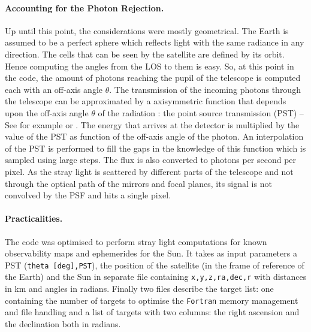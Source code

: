 \documentclass[a4paper,10pt]{article}
\begin{document}
\paragraph{Accounting for the Photon Rejection.} Up until this point, the considerations were mostly geometrical. The Earth is assumed to be a perfect sphere which reflects light with the same radiance in any direction. The cells that can be seen by the satellite are defined by its orbit. Hence computing the angles from the LOS to them is easy.
So, at this point in the code, the amount of photons reaching the pupil of the telescope is computed each with an off-axis angle $\theta$. The transmission of the incoming photons through the telescope can be approximated by a axisymmetric function that depends upon the off-axis angle $\theta$ of the radiation : the point source transmission (PST) -- See for example \cite{Breault2010} or \cite{Pompea1995}. 
The energy that arrives at the detector is multiplied by the value of the PST as function of the off-axis angle of the photon. 
An interpolation of the PST is performed to fill the gaps in the knowledge of this function which is sampled using large steps. The flux is also converted to photons per second per pixel. As the stray light is scattered by different parts of the telescope and not through the optical path of the mirrors and focal planes, its signal is not convolved by the PSF and hits a single pixel.

\paragraph{Practicalities.} The code was optimised to perform stray light computations for known observability maps and ephemerides for the Sun. It takes as input parameters a PST (\verb=theta [deg],PST=), the position of the satellite (in the frame of reference of the Earth) and the Sun in separate file containing \verb=x,y,z,ra,dec,r= with distances in km and angles in radians. Finally two files describe the target list: one containing the number of targets to optimise the \verb=Fortran= memory management and file handling and a list of targets with two columns: the right ascension and the declination both in radians. 
\end{document}
